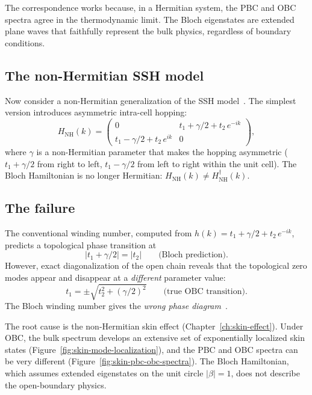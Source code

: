 The correspondence works because, in a Hermitian system, the PBC and
OBC spectra agree in the thermodynamic limit. The Bloch eigenstates
are extended plane waves that faithfully represent the bulk physics,
regardless of boundary conditions.

\subsection{The non-Hermitian SSH model}
\label{ssec:nh-ssh}

Now consider a non-Hermitian generalization of the SSH model~\cite{lin2023topological,kunst2018biorthogonal}. The
simplest version introduces asymmetric intra-cell hopping:
\begin{equation}
 H_{\mathrm{NH}}(k) = \begin{pmatrix} 0 & t_1 + \gamma/2 + t_2\,e^{-ik} \\
 t_1 - \gamma/2 + t_2\,e^{ik} & 0 \end{pmatrix},
 \label{eq:nh-ssh-bloch}
\end{equation}
where $\gamma$ is a non-Hermitian parameter that makes the hopping
asymmetric ($t_1 + \gamma/2$ from right to left, $t_1 - \gamma/2$
from left to right within the unit cell). The Bloch Hamiltonian is no
longer Hermitian: $H_{\mathrm{NH}}(k) \neq H_{\mathrm{NH}}^\dagger(k)$.

\subsection{The failure}
\label{ssec:bbc-problem}

The conventional winding number, computed from $h(k) = t_1 + \gamma/2
+ t_2\,e^{-ik}$, predicts a topological phase transition at
\begin{equation}
 |t_1 + \gamma/2| = |t_2|
 \qquad\text{(Bloch prediction)}.
 \label{eq:bloch-transition}
\end{equation}
However, exact diagonalization of the open chain reveals that the
topological zero modes appear and disappear at a \emph{different}
parameter value:
\begin{equation}
 t_1 = \pm\sqrt{t_2^2 + (\gamma/2)^2}
 \qquad\text{(true OBC transition)}.
 \label{eq:obc-transition}
\end{equation}
The Bloch winding number gives the \emph{wrong phase diagram}~\cite{shen2017topological,yao2018edge,yokomizo2019non}.

The root cause is the non-Hermitian skin effect
(Chapter~\ref{ch:skin-effect}). Under OBC, the bulk spectrum develops
an extensive set of exponentially localized skin states
(Figure~\ref{fig:skin-mode-localization}), and the PBC and OBC spectra
can be very different
(Figure~\ref{fig:skin-pbc-obc-spectra}). The Bloch Hamiltonian,
which assumes extended eigenstates on the unit circle $|\beta| = 1$,
does not describe the open-boundary physics.

